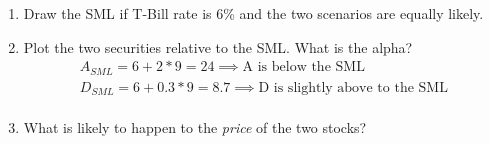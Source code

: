 \documentclass[11pt]{article}
\theoremstyle{definition}
\begin{document}
\begin{shaded}
\begin{enumerate}
\begin{align*}
                \end{align*}
            \item Draw the SML if T-Bill rate is 6\% and the two scenarios are equally likely.
            \item Plot the two securities relative to the SML. What is the alpha?
            \begin{align*}
                    A_{SML} = 6+2*9 = 24 \implies \text{A is below the SML}\\
                    D_{SML} = 6+0.3*9 = 8.7 \implies \text{D is slightly above to the SML}\\
                \end{align*}
            \item What is likely to happen to the \textit{price} of the two stocks?
        \end{enumerate}

    \end{shaded}
\end{document}
